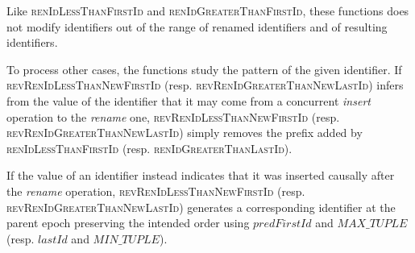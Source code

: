 \documentclass[10pt,journal,compsoc]{IEEEtran}
\newcommand{\trm}[1]{\mathit{#1}}
\begin{document}
Like \textsc{renIdLessThanFirstId} and \textsc{renIdGreaterThanFirstId}, these functions does not modify identifiers out of the range of renamed identifiers and of resulting identifiers.

To process other cases, the functions study the pattern of the given identifier.
If \textsc{revRenIdLessThanNewFirstId} (resp. \textsc{revRenIdGreaterThanNewLastId}) infers from the value of the identifier that it may come from a concurrent \emph{insert} operation to the \emph{rename} one, \textsc{revRenIdLessThanNewFirstId} (resp. \textsc{revRenIdGreaterThanNewLastId}) simply removes the prefix added by \textsc{renIdLessThanFirstId} (resp. \textsc{renIdGreaterThanLastId}).

If the value of an identifier instead indicates that it was inserted causally after the \emph{rename} operation, \textsc{revRenIdLessThanNewFirstId} (resp. \textsc{revRenIdGreaterThanNewLastId}) generates a corresponding identifier at the parent epoch preserving the intended order using $\trm{predFirstId}$ and $\trm{MAX\_TUPLE}$ (resp. $\trm{lastId}$ and $\trm{MIN\_TUPLE}$).






\end{document}
